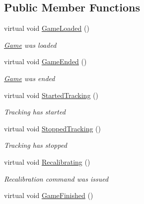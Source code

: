 \subsection*{Public Member Functions}
\begin{DoxyCompactItemize}
\item 
virtual void \mbox{\hyperlink{class_chess_tracking_1_1_controlling_elements_1_1_program_state_1_1_program_state_ae44259fd379473c103e8957d51832de9}{Game\+Loaded}} ()
\begin{DoxyCompactList}\small\item\em \mbox{\hyperlink{namespace_chess_tracking_1_1_game}{Game}} was loaded \end{DoxyCompactList}\item 
virtual void \mbox{\hyperlink{class_chess_tracking_1_1_controlling_elements_1_1_program_state_1_1_program_state_a7ff7676272d3449e524a11eb73201e30}{Game\+Ended}} ()
\begin{DoxyCompactList}\small\item\em \mbox{\hyperlink{namespace_chess_tracking_1_1_game}{Game}} was ended \end{DoxyCompactList}\item 
virtual void \mbox{\hyperlink{class_chess_tracking_1_1_controlling_elements_1_1_program_state_1_1_program_state_a633786bcd19a9f94d568115db3cdb5d9}{Started\+Tracking}} ()
\begin{DoxyCompactList}\small\item\em Tracking has started \end{DoxyCompactList}\item 
virtual void \mbox{\hyperlink{class_chess_tracking_1_1_controlling_elements_1_1_program_state_1_1_program_state_a0c86a45963ed8eb2b938f5d8f2d956ff}{Stopped\+Tracking}} ()
\begin{DoxyCompactList}\small\item\em Tracking has stopped \end{DoxyCompactList}\item 
virtual void \mbox{\hyperlink{class_chess_tracking_1_1_controlling_elements_1_1_program_state_1_1_program_state_a702ebae08f0615d645dfaa4334ea62fc}{Recalibrating}} ()
\begin{DoxyCompactList}\small\item\em Recalibration command was issued \end{DoxyCompactList}\item 
virtual void \mbox{\hyperlink{class_chess_tracking_1_1_controlling_elements_1_1_program_state_1_1_program_state_a03a8db068264aa4ec11e8d473b6d3c46}{Game\+Finished}} ()

\end{DoxyCompactItemize}
